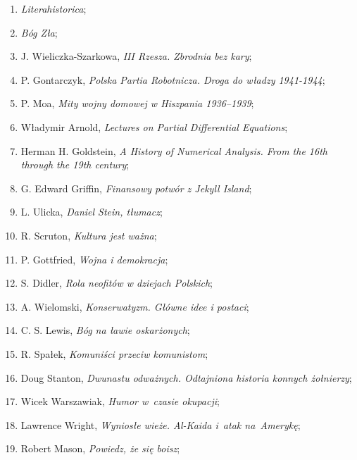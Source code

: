 \documentclass[a4paper,11pt]{article}
\begin{document}
\begin{enumerate}
\item \emph{Literahistorica};

\item \emph{Bóg Zła};

\item J. Wieliczka-Szarkowa, \emph{III Rzesza. Zbrodnia bez kary};

\item P. Gontarczyk, \emph{Polska Partia Robotnicza. Droga do władzy
    1941-1944};

\item P. Moa, \emph{Mity wojny domowej w Hiszpania 1936--1939};

\item Władymir Arnold, \emph{Lectures on Partial Differential Equations};

\item Herman H. Goldstein, \emph{A History of Numerical Analysis. From the 16th through the 19th century};

\item G. Edward Griffin, \emph{Finansowy potwór z Jekyll Island};

\item L. Ulicka, \emph{Daniel Stein, tłumacz};

\item R. Scruton, \emph{Kultura jest ważna};

\item P. Gottfried, \emph{Wojna i demokracja};

\item S. Didler, \emph{Rola neofitów w dziejach Polskich};

\item A. Wielomski, \emph{Konserwatyzm. Główne idee i postaci};

\item C. S. Lewis, \emph{Bóg na ławie oskarżonych};

\item R. Spałek, \emph{Komuniści przeciw komunistom};

\item Doug Stanton, \emph{Dwunastu odważnych. Odtajniona historia
    konnych żołnierzy};

\item Wicek Warszawiak, \emph{Humor w~czasie okupacji};

\item Lawrence Wright, \emph{Wyniosłe wieże. Al-Kaida i~atak
    na~Amerykę};

\item Robert Mason, \emph{Powiedz, że się boisz};


\end{enumerate}
\end{document}

